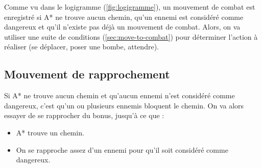 Comme vu dans le logigramme (\autoref{fig:logigramme}), un mouvement de combat est enregistré si A* ne trouve aucun chemin, qu'un ennemi est considéré comme dangereux et qu'il n'existe pas déjà un mouvement de combat.
Alors, on va utiliser une suite de conditions (\autoref{sec:move-to-combat}) pour déterminer l'action à réaliser (se déplacer, poser une bombe, attendre).

\subsection{Mouvement de rapprochement}

Si A* ne trouve aucun chemin et qu'aucun ennemi n'est considéré comme dangereux, c'est qu'un ou plusieurs ennemis bloquent le chemin.
On va alors essayer de se rapprocher du bonus, jusqu'à ce que : 
\begin{itemize}
    \item A* trouve un chemin.
    \item On se rapproche assez d'un ennemi pour qu'il soit considéré comme dangereux.
\end{itemize}